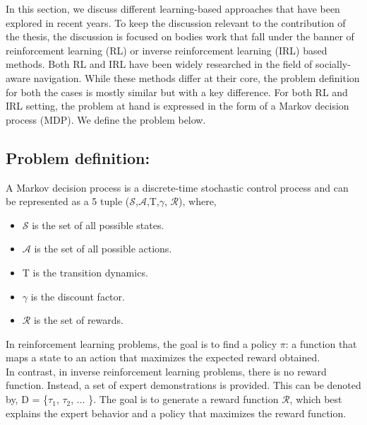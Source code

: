 \label{ch:3}
In this section, we discuss different learning-based approaches that have been explored in recent years. To keep the discussion relevant to the contribution of the thesis, the discussion is focused on bodies work that fall under the banner of reinforcement learning (RL) or inverse reinforcement learning (IRL) based methods. Both RL and IRL have been widely researched in the field of socially-aware navigation. While these methods differ at their core, the problem definition for both the cases is mostly similar but with a key difference. For both RL and IRL setting, the problem at hand is expressed in the form of a Markov decision process (MDP). We define the problem below.
\subsection*{Problem definition:}
A Markov decision process is a discrete-time stochastic control process and can be represented as a 5 tuple
($\mathcal{S}$,$\mathcal{A}$,T,$\gamma$, $\mathcal{R}$), where,
\begin{itemize}
    \item $\mathcal{S}$ is the set of all possible states.
    \item $\mathcal{A}$ is the set of all possible actions.
    \item T is the transition dynamics.
    \item $\gamma$ is the discount factor.
    \item $\mathcal{R}$ is the set of rewards.
\end{itemize}  
In reinforcement learning problems, the goal is to find a policy $\pi$: a function that maps a state to an action that maximizes the expected reward obtained.\\
In contrast, in inverse reinforcement learning problems, there is no reward function. Instead, a set of expert demonstrations is provided. This can be denoted by, D = \{$\tau_1$, $\tau_2$, ... \}. The goal is to generate a reward function $\mathcal{R}$, which best explains the expert behavior and a policy that maximizes the reward function.


